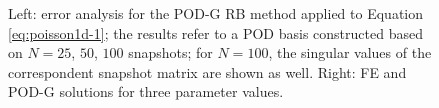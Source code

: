 \documentclass[12pt, a4paper, twoside, openright]{report}
\numberwithin{equation}{chapter}
\theoremstyle{theorem}
\theoremstyle{definition}
\theoremstyle{remark}
\theoremstyle{proposition}
\numberwithin{figure}{chapter}
\begin{document}
\begin{figure}[H]
			
			\caption{Left: error analysis for the POD-G RB method applied to Equation \eqref{eq:poisson1d-1}; the results refer to a POD basis constructed based on $N = 25$, $50$, $100$ snapshots; for $N = 100$, the singular values of the correspondent snapshot matrix are shown as well. Right: FE and POD-G solutions for three parameter values.}
			\label{fig:poisson1d-1-fig1}
		\end{figure}
						
\end{document}
